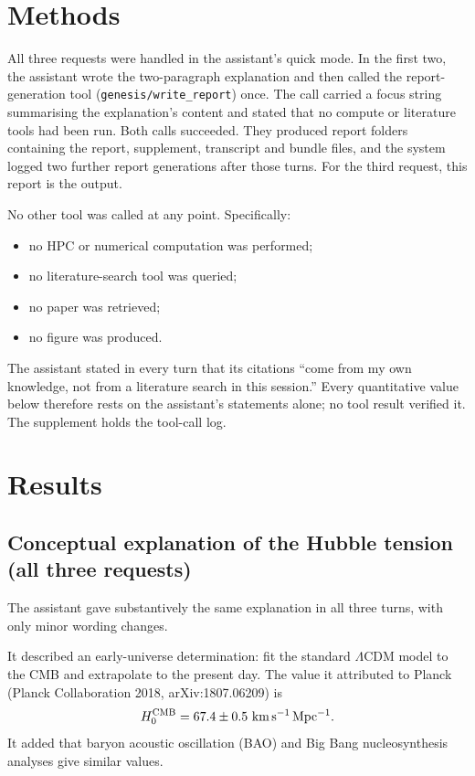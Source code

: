 \documentclass[11pt,a4paper]{article}
\begin{document}
\section{Methods}
All three requests were handled in the assistant's quick mode. In the first two, the assistant wrote the two-paragraph explanation and then called the report-generation tool (\texttt{genesis/write\_report}) once. The call carried a focus string summarising the explanation's content and stated that no compute or literature tools had been run. Both calls succeeded. They produced report folders containing the report, supplement, transcript and bundle files, and the system logged two further report generations after those turns. For the third request, this report is the output.

No other tool was called at any point. Specifically:
\begin{itemize}
\item no HPC or numerical computation was performed;
\item no literature-search tool was queried;
\item no paper was retrieved;
\item no figure was produced.
\end{itemize}

The assistant stated in every turn that its citations ``come from my own knowledge, not from a literature search in this session.'' Every quantitative value below therefore rests on the assistant's statements alone; no tool result verified it. The supplement holds the tool-call log.

\section{Results}
\subsection{Conceptual explanation of the Hubble tension (all three requests)}
The assistant gave substantively the same explanation in all three turns, with only minor wording changes.

It described an early-universe determination: fit the standard $\Lambda$CDM model to the CMB and extrapolate to the present day. The value it attributed to Planck (Planck Collaboration 2018, arXiv:1807.06209) is
\begin{equation}
H_0^{\rm CMB} = 67.4 \pm 0.5~\mathrm{km\,s^{-1}\,Mpc^{-1}}.
\end{equation}
It added that baryon acoustic oscillation (BAO) and Big Bang nucleosynthesis analyses give similar values.
\end{document}

